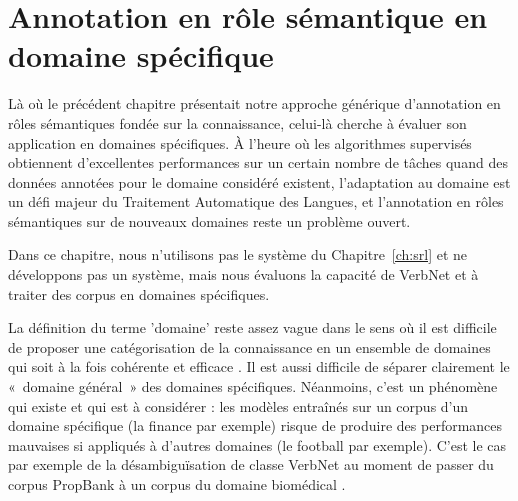 

\chapter{Annotation en rôle sémantique en domaine spécifique}
\label{ch:domainsrl}

Là où le précédent chapitre présentait notre approche générique d'annotation en
rôles sémantiques fondée sur la connaissance, celui-là cherche à évaluer son
application en domaines spécifiques. À l'heure où les algorithmes supervisés
obtiennent d'excellentes performances sur un certain nombre de tâches quand des
données annotées pour le domaine considéré existent, l'adaptation au domaine
est un défi majeur du Traitement Automatique des Langues, et l'annotation en
rôles sémantiques sur de nouveaux domaines reste un problème ouvert.

Dans ce chapitre, nous n'utilisons pas le système du Chapitre~\ref{ch:srl} et
ne développons pas un système, mais nous évaluons la capacité de VerbNet et
\verbenet{} à traiter des corpus en domaines spécifiques.

La définition du terme 'domaine' reste assez vague dans le sens où il est
difficile de proposer une catégorisation de la connaissance en un ensemble de
domaines qui soit à la fois cohérente et efficace \citep{ma2012rethinking}. Il
est aussi difficile de séparer clairement le «~domaine général~» des domaines
spécifiques. Néanmoins, c'est un phénomène qui existe et qui est à considérer :
les modèles entraînés sur un corpus d'un domaine spécifique (la finance par
exemple) risque de produire des performances mauvaises si appliqués à d'autres
domaines (le football par exemple). C'est le cas par exemple de la
désambiguïsation de classe VerbNet au moment de passer du corpus PropBank à un
corpus du domaine biomédical \citep{abend2008supervised}.

